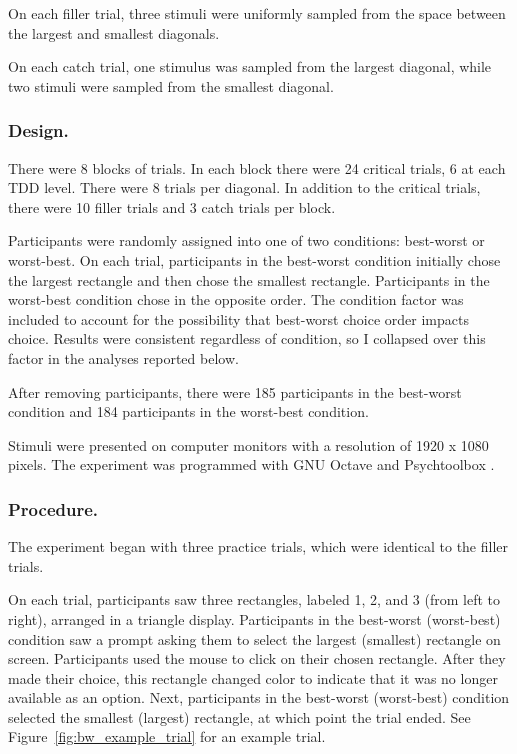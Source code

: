 On each filler trial, three stimuli were uniformly sampled from the space between the largest and smallest diagonals.

On each catch trial, one stimulus was sampled from the largest diagonal, while two stimuli were sampled from the smallest diagonal.

\subsubsection{Design.}
There were 8 blocks of trials. In each block there were 24 critical trials, 6 at each TDD level. There were 8 trials per diagonal. In addition to the critical trials, there were 10 filler trials and 3 catch trials per block.

Participants were randomly assigned into one of two conditions: best-worst or worst-best. On each trial, participants in the best-worst condition initially chose the largest rectangle and then chose the smallest rectangle. Participants in the worst-best condition chose in the opposite order. The condition factor was included to account for the possibility that best-worst choice order impacts choice. Results were consistent regardless of condition, so I collapsed over this factor in the analyses reported below.

After removing participants, there were 185 participants in the best-worst condition and 184 participants in the worst-best condition.

Stimuli were presented on computer monitors with a resolution of 1920 x 1080 pixels. The experiment was programmed with GNU Octave and Psychtoolbox \parencite{octave,brainardPsychophysicsToolbox1997}. 

\subsubsection{Procedure.}

The experiment began with three practice trials, which were identical to the filler trials. 

On each trial, participants saw three rectangles, labeled 1, 2, and 3 (from left to right), arranged in a triangle display. Participants in the best-worst (worst-best) condition saw a prompt asking them to select the largest (smallest) rectangle on screen. Participants used the mouse to click on their chosen rectangle. After they made their choice, this rectangle changed color to indicate that it was no longer available as an option. Next, participants in the best-worst (worst-best) condition selected the smallest (largest) rectangle, at which point the trial ended. See Figure~\ref{fig:bw_example_trial} for an example trial.

